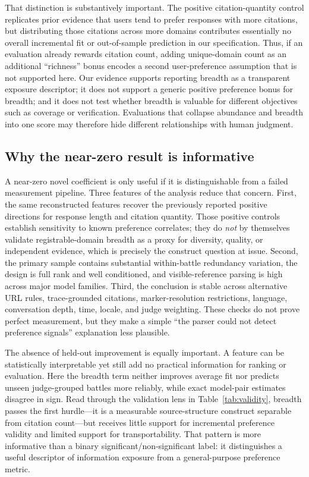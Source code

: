 \documentclass[sigconf,natbib=true,anonymous=true]{acmart}
\begin{document}
That distinction is substantively important. The positive citation-quantity control replicates prior evidence that users tend to prefer responses with more citations, but distributing those citations across more domains contributes essentially no overall incremental fit or out-of-sample prediction in our specification. Thus, if an evaluation already rewards citation count, adding unique-domain count as an additional ``richness'' bonus encodes a second user-preference assumption that is not supported here. Our evidence supports reporting breadth as a transparent exposure descriptor; it does not support a generic positive preference bonus for breadth; and it does not test whether breadth is valuable for different objectives such as coverage or verification. Evaluations that collapse abundance and breadth into one score may therefore hide different relationships with human judgment.

\subsection{Why the near-zero result is informative}
A near-zero novel coefficient is only useful if it is distinguishable from a failed measurement pipeline. Three features of the analysis reduce that concern. First, the same reconstructed features recover the previously reported positive directions for response length and citation quantity. Those positive controls establish sensitivity to known preference correlates; they do \emph{not} by themselves validate registrable-domain breadth as a proxy for diversity, quality, or independent evidence, which is precisely the construct question at issue. Second, the primary sample contains substantial within-battle redundancy variation, the design is full rank and well conditioned, and visible-reference parsing is high across major model families. Third, the conclusion is stable across alternative URL rules, trace-grounded citations, marker-resolution restrictions, language, conversation depth, time, locale, and judge weighting. These checks do not prove perfect measurement, but they make a simple ``the parser could not detect preference signals'' explanation less plausible.

The absence of held-out improvement is equally important. A feature can be statistically interpretable yet still add no practical information for ranking or evaluation. Here the breadth term neither improves average fit nor predicts unseen judge-grouped battles more reliably, while exact model-pair estimates disagree in sign. Read through the validation lens in Table~\ref{tab:validity}, breadth passes the first hurdle---it is a measurable source-structure construct separable from citation count---but receives little support for incremental preference validity and limited support for transportability. That pattern is more informative than a binary significant/non-significant label: it distinguishes a useful descriptor of information exposure from a general-purpose preference metric.
\end{document}
